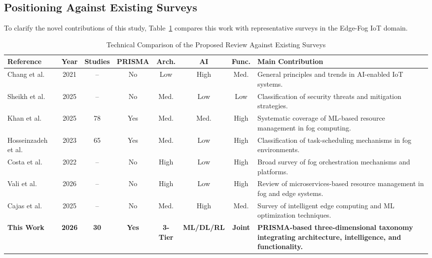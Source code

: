 \documentclass[conference]{IEEEtran}
\begin{document}
\subsection{Positioning Against Existing Surveys}
To clarify the novel contributions of this study, Table~\ref{tab:survey_comparison} compares this work with representative surveys in the Edge-Fog IoT domain.


\begin{table}[t]
\centering
\caption{Technical Comparison of the Proposed Review Against Existing Surveys}
\label{tab:survey_comparison}

\small
\setlength{\tabcolsep}{5pt}
\renewcommand{\arraystretch}{1.15}

\begin{tabular}{lccccccp{5.7cm}}
\toprule
\textbf{Reference} &
\textbf{Year} &
\textbf{Studies} &
\textbf{PRISMA} &
\textbf{Arch.} &
\textbf{AI} &
\textbf{Func.} &
\textbf{Main Contribution} \\
\midrule

Chang et al. \cite{b1}
& 2021
& -- 
& No
& Low
& High
& Med.
& General principles and trends in AI-enabled IoT systems. \\

Sheikh et al. \cite{b5}
& 2025
& --
& No
& Med.
& Low
& Low
& Classification of security threats and mitigation strategies. \\

Khan et al. \cite{b9}
& 2025
& 78
& Yes
& Med.
& Med.
& High
& Systematic coverage of ML-based resource management in fog computing. \\

Hosseinzadeh et al. \cite{b10}
& 2023
& 65
& Yes
& Med.
& Low
& High
& Classification of task-scheduling mechanisms in fog environments. \\

Costa et al. \cite{b15}
& 2022
& --
& No
& High
& Low
& High
& Broad survey of fog orchestration mechanisms and platforms. \\

Vali et al. \cite{b24}
& 2026
& --
& No
& High
& Low
& High
& Review of microservices-based resource management in fog and edge systems. \\

Cajas et al. \cite{b28}
& 2025
& --
& No
& Med.
& High
& Med.
& Survey of intelligent edge computing and ML optimization techniques. \\

\textbf{This Work}
& \textbf{2026}
& \textbf{30}
& \textbf{Yes}
& \textbf{3-Tier}
& \textbf{ML/DL/RL}
& \textbf{Joint}
& \textbf{PRISMA-based three-dimensional taxonomy integrating architecture, intelligence, and functionality.} \\

\bottomrule
\end{tabular}
\end{table}
\end{document}
